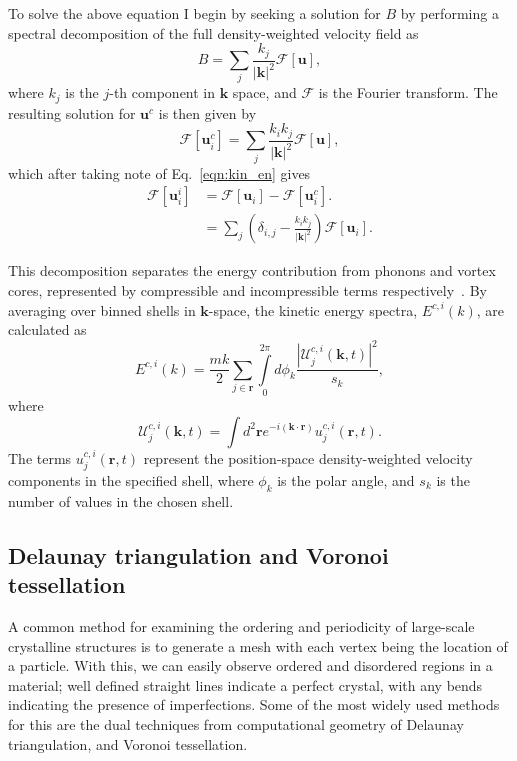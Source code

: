 To solve the above equation I begin by seeking a solution for $B$ by performing a spectral decomposition of the full density-weighted velocity field as
\begin{equation}
    B = \displaystyle\sum\limits_{j} \frac{k_j}{|\mathbf{k}|^2}\mathscr{F}[\mathbf{u}],
\end{equation}
where $k_j$ is the $j$-th component in $\mathbf{k}$ space, and $\mathscr{F}$ is the Fourier transform. The resulting solution for $\mathbf{u}^c$ is then given by
\begin{equation}
    \mathscr{F}[\mathbf{u}_i^c] = \displaystyle\sum\limits_{j} \frac{k_i k_j}{|\mathbf{k}|^2} \mathscr{F}[\mathbf{u}],
\end{equation}
which after taking note of Eq.~\eqref{eqn:kin_en} gives
\begin{align}
    \mathscr{F}[\mathbf{u}_i^i] &= \mathscr{F}[\mathbf{u}_i] - \mathscr{F}[\mathbf{u}_i^c]. \\
    &= \displaystyle\sum\limits_{j}\left(\delta_{i,j} - \frac{k_ik_j}{|\mathbf{k}|^2}\right)\mathscr{F}[\mathbf{u}_i]. \nonumber
\end{align}

This decomposition separates the energy contribution from phonons and vortex cores, represented by compressible and incompressible terms respectively~\cite{CT:Horng_pra_2009}. By averaging over binned shells in $\mathbf{k}$-space, the kinetic energy spectra, $E^{c,i}(k)$, are calculated as~\cite{CT:Bradley_prx_2012}
\begin{equation}
	E^{c,i}(k) = \frac{mk}{2}\sum\limits_{j\in\mathbf{r}} \int\limits_{0}^{2\pi}d\phi_k \frac{ |\mathcal{U}_j^{c,i}(\mathbf{k},t) |^2}{s_k},
\end{equation}
where
\begin{equation}
	\mathcal{U}_j^{c,i}(\mathbf{k},t) = \int d^2 \mathbf{r} e^{-i(\mathbf{k}\cdot\mathbf{r})} u_j^{c,i}(\mathbf{r},t).
\end{equation}
The terms $u_j^{c,i}(\mathbf{r},t)$ represent the position-space density-weighted velocity components in the specified shell, where $\phi_k$ is the polar angle, and $s_k$ is the number of values in the chosen shell.

\subsection{Delaunay triangulation and Voronoi tessellation}\label{sec:delaunay}
A common method for examining the ordering and periodicity of large-scale crystalline structures is to generate a mesh with each vertex being the location of a particle. With this, we can easily observe ordered and disordered regions in a material; well defined straight lines indicate a perfect crystal, with any bends indicating the presence of imperfections. Some of the most widely used methods for this are the dual techniques from computational geometry of Delaunay triangulation, and Voronoi tessellation.

